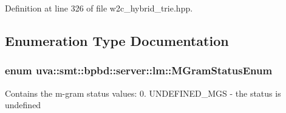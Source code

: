 Definition at line 326 of file w2c\+\_\+hybrid\+\_\+trie.\+hpp.



\subsection{Enumeration Type Documentation}
\hypertarget{namespaceuva_1_1smt_1_1bpbd_1_1server_1_1lm_ab9b3e7382b561dcb8abcd6b55e9b796a}{}
\subsubsection[{M\+Gram\+Status\+Enum}]{\setlength{\rightskip}{0pt plus 5cm}enum {\bf uva\+::smt\+::bpbd\+::server\+::lm\+::\+M\+Gram\+Status\+Enum}}\label{namespaceuva_1_1smt_1_1bpbd_1_1server_1_1lm_ab9b3e7382b561dcb8abcd6b55e9b796a}
Contains the m-\/gram status values\+: 0. U\+N\+D\+E\+F\+I\+N\+E\+D\+\_\+\+M\+G\+S -\/ the status is undefined
